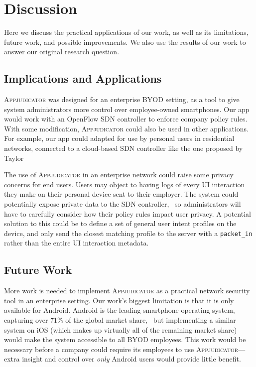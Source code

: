 \section{Discussion}
\label{sec:discussion}

Here we discuss the practical applications of our work, as well as its
limitations, future work, and possible improvements. We also use the results of
our work to answer our original research question.

\subsection{Implications and Applications}
\label{sec:implications-and-applications}

\textsc{Appjudicator} was designed for an enterprise BYOD setting, as a tool to
give system administrators more control over employee-owned smartphones.  Our
app would work with an OpenFlow SDN controller to enforce company policy rules.
With some modification, \textsc{Appjudicator} could also be used in other
applications. For example, our app could adapted for use by personal users in
residential networks, connected to a cloud-based SDN controller like the one
proposed by Taylor~\etal\cite{taylor2017shue}

The use of \textsc{Appjudicator} in an enterprise network could raise some
privacy concerns for end users. Users may object to having logs of every UI
interaction they make on their personal device sent to their employer. The
system could potentially expose private data to the SDN
controller,~\cite{kalysch2018} so administrators will have to carefully consider
how their policy rules impact user privacy. A potential solution to this could
be to define a set of general user intent profiles on the device, and only send
the closest matching profile to the server with a \texttt{packet\_in} rather
than the entire UI interaction metadata.

\subsection{Future Work}
\label{sec:future-work}

More work is needed to implement \textsc{Appjudicator} as a practical network
security tool in an enterprise setting. Our work's biggest limitation is that it
is only available for Android. Android is the leading smartphone operating
system, capturing over 71\% of the global market share,~\cite{statcounter2021}
but implementing a similar system on iOS (which makes up virtually all of the
remaining market share) would make the system accessible to all BYOD employees.
This work would be necessary before a company could require its employees to use
\textsc{Appjudicator}---extra insight and control over \textit{only} Android
users would provide little benefit.


